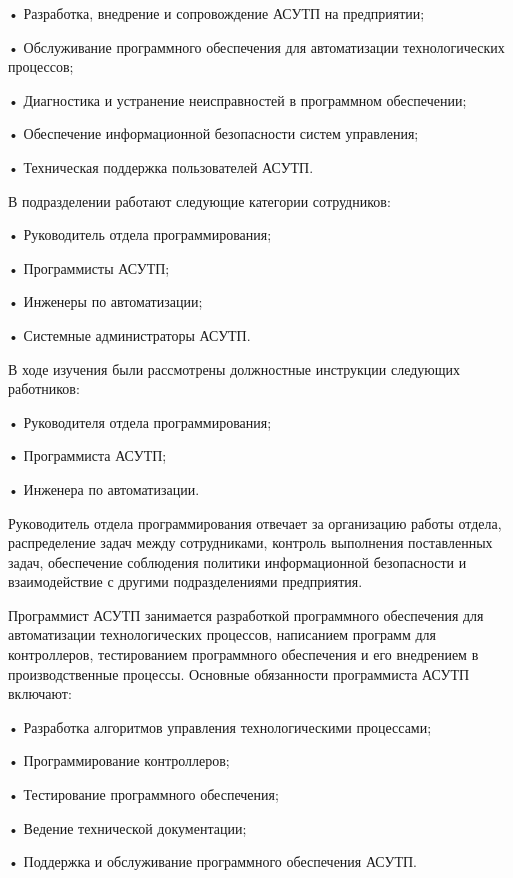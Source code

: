 {  \par \redline • Разработка, внедрение и сопровождение АСУТП на предприятии;
  \par \redline • Обслуживание программного обеспечения для автоматизации технологических процессов;
  \par \redline • Диагностика и устранение неисправностей в программном обеспечении;
  \par \redline • Обеспечение информационной безопасности систем управления;
  \par \redline • Техническая поддержка пользователей АСУТП.
  \par \redline В подразделении работают следующие категории сотрудников:
  \par \redline • Руководитель отдела программирования;
  \par \redline • Программисты АСУТП;
  \par \redline • Инженеры по автоматизации;
  \par \redline • Системные администраторы АСУТП.
  \par \redline В ходе изучения были рассмотрены должностные инструкции следующих работников:
  \par \redline • Руководителя отдела программирования;
  \par \redline • Программиста АСУТП;
  \par \redline • Инженера по автоматизации.
  \par \redline Руководитель отдела программирования отвечает за организацию работы отдела, распределение задач между сотрудниками, контроль выполнения поставленных задач, обеспечение соблюдения политики информационной безопасности и взаимодействие с другими подразделениями предприятия.
  \par \redline Программист АСУТП занимается разработкой программного обеспечения для автоматизации технологических процессов, написанием программ для контроллеров, тестированием программного обеспечения и его внедрением в производственные процессы. Основные обязанности программиста АСУТП включают:
  \par \redline • Разработка алгоритмов управления технологическими процессами;
  \par \redline • Программирование контроллеров;
  \par \redline • Тестирование программного обеспечения;
  \par \redline • Ведение технической документации;
  \par \redline • Поддержка и обслуживание программного обеспечения АСУТП.
}
